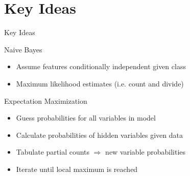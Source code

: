 \documentclass[14pt]{beamer}
\begin{document}
\part{Key Ideas}
\begin{frame}{Key Ideas}
\begin{block}{Naive Bayes}
\begin{itemize}
\item Assume features conditionally independent given class
\item Maximum likelihood estimates (i.e. count and divide)
\end{itemize}
\end{block}
\begin{block}{Expectation Maximization}
\begin{itemize}
\item Guess probabilities for all variables in model
\item Calculate probabilities of hidden variables given data
\item Tabulate partial counts $\Rightarrow$ new variable probabilities
\item Iterate until local maximum is reached
\end{itemize}
\end{block}
\end{frame}
\end{document}
